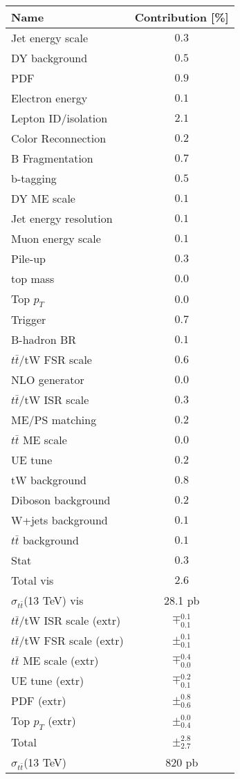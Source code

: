 \begin{tabular}{ l |  c }
 \hline
Name & Contribution [\%] \\ \hline
Jet energy scale & ${0.3}$ \\
DY background & ${0.5}$ \\
PDF & ${0.9}$ \\
Electron energy & ${0.1}$ \\
Lepton ID/isolation & ${2.1}$ \\
Color Reconnection & ${0.2}$ \\
B Fragmentation & ${0.7}$ \\
b-tagging & ${0.5}$ \\
DY ME scale & ${0.1}$ \\
Jet energy resolution & ${0.1}$ \\
Muon energy scale & ${0.1}$ \\
Pile-up & ${0.3}$ \\
top mass & ${0.0}$ \\
Top $p_{T}$ & ${0.0}$ \\
Trigger & ${0.7}$ \\
B-hadron BR & ${0.1}$ \\
$t\bar{t}$/tW FSR scale & ${0.6}$ \\
NLO generator & ${0.0}$ \\
$t\bar{t}$/tW ISR scale & ${0.3}$ \\
ME/PS matching & ${0.2}$ \\
$t\bar{t}$ ME scale & ${0.0}$ \\
UE tune & ${0.2}$ \\
tW background & ${0.8}$ \\
Diboson background & ${0.2}$ \\
W+jets background & ${0.1}$ \\
$t\bar{t}$ background & ${0.1}$ \\
Stat & ${0.3}$ \\
Total vis & ${2.6}$ \\ \hline
$\sigma_{t\bar{t}}$(13 TeV) vis & 28.1 pb \\ \hline
$t\bar{t}$/tW ISR scale (extr) & $\mp^{0.1}_{0.1}$ \\
$t\bar{t}$/tW FSR scale (extr) & $\pm^{0.1}_{0.1}$ \\
$t\bar{t}$ ME scale (extr) & $\mp^{0.4}_{0.0}$ \\
UE tune (extr) & $\mp^{0.2}_{0.1}$ \\
PDF (extr) & $\pm^{0.8}_{0.6}$ \\
Top $p_{T}$ (extr) & $\pm^{0.0}_{0.4}$ \\ \hline
Total & $\pm^{2.8}_{2.7}$ \\ \hline
$\sigma_{t\bar{t}}$(13 TeV) & 820 pb \\ \hline \hline
\end{tabular}%
